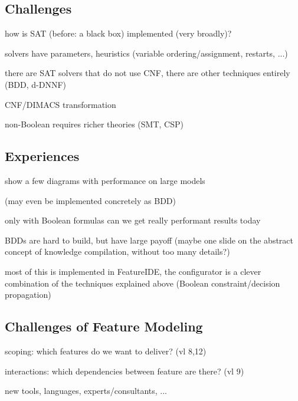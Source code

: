 \subsection{Challenges}
\begin{frame}{\myframetitle}
	how is SAT (before: a black box) implemented (very broadly)?

	solvers have parameters, heuristics (variable ordering/assignment, restarts, ...)

	there are SAT solvers that do not use CNF, there are other techniques entirely (BDD, d-DNNF)

	CNF/DIMACS transformation

	non-Boolean requires richer theories (SMT, CSP)
\end{frame}

\subsection{Experiences} %
\begin{frame}{\myframetitle}
	show a few diagrams with performance on large models

	(may even be implemented concretely as BDD)

	only with Boolean formulas can we get really performant results today

	BDDs are hard to build, but have large payoff (maybe one slide on the abstract concept of knowledge compilation, without too many details?)

	most of this is implemented in FeatureIDE, the configurator is a clever combination of the techniques explained above (Boolean constraint/decision propagation) %



\end{frame}


\subsection{Challenges of Feature Modeling}

\begin{frame}{\myframetitle}
	scoping: which features do we want to deliver? (vl 8,12)

	interactions: which dependencies between feature are there? (vl 9)

	new tools, languages, experts/consultants, ...
\end{frame}